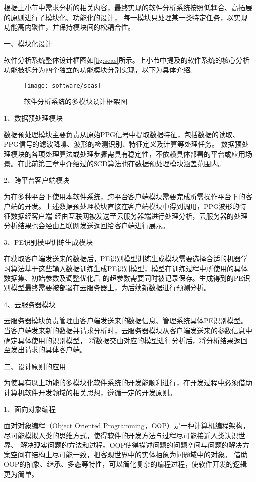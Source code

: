 根据上小节中需求分析的相关内容，最终实现的软件分析系统按照低耦合、高拓展的原则进行了模块化、功能化的设计，
每一模块只处理某一类特定任务，以实现功能高内聚性，并保持模块间的松耦合性。

一、模块化设计

软件分析系统整体设计框图如\autoref{fig:scas}所示。上小节中提及的软件系统的核心分析功能被拆分为四个独立的功能模块分别实现，以下为具体介绍。
\begin{figure}[htbp]
    \centering
    \texttt{[image: software/scas]}
    \caption{\label{fig:scas}软件分析系统的多模块设计框架图}
\end{figure}

1、数据预处理模块

数据预处理模块主要负责从原始PPG信号中提取数据特征，包括数据的读取、PPG信号的滤波降噪、波形的检测识别、特征定义及计算等处理任务。
数据预处理模块的各项处理算法或处理步骤需具有稳定性，不依赖具体部署的平台或应用场景。在此前第三章中介绍过的SCD算法也在数据预处理模块涵盖范围内。

2、跨平台客户端模块

为在多种平台下使用本软件系统，跨平台客户端模块需要完成所需操作平台下的客户端的开发。上述数据预处理模块直接在客户端模块中得到调用，PPG波形的特征数据经客户端
经由互联网被发送至云服务器端进行处理分析，云服务器的处理分析结果也会经由互联网发送返回给客户端进行展示。

3、PE识别模型训练生成模块

在获取客户端发送来的数据后，PE识别模型训练生成模块需要选择合适的机器学习算法基于这些输入数据训练生成PE识别模型，模型在训练过程中所使用的具体数据集、初始参数及调整优化后
的超参数需要同时被记录保存。生成得到的PE识别模型最终需要被部署在云服务器上，为后续新数据进行预测分析。

4、云服务器模块

云服务器模块负责管理由客户端发送来的数据信息、管理系统具体PE识别模型。当客户端发来新的数据并请求分析时，云服务器模块从客户端发送来的参数信息中确定具体使用的识别模型，
将数据交由对应的模型进行分析后，将分析结果返回至发出请求的具体客户端。

二、设计原则的应用

为使具有以上功能的多模块化软件系统的开发能顺利进行，在开发过程中必须借助计算机软件开发领域的相关思想，遵循一定的开发原则。

1、面向对象编程

面对对象编程（Object Oriented Programming，OOP）是一种计算机编程架构，尽可能模拟人类的思维方式，使得软件的开发方法与过程尽可能接近人类认识世界、
解决现实问题的方法和过程。OOP使得描述问题的问题空间与问题的解决方案空间在结构上尽可能一致，把客观世界中的实体抽象为问题域中的对象。
借助OOP的抽象、继承、多态等特性，可以简化复杂的编程过程，使软件开发的逻辑更为简单。

